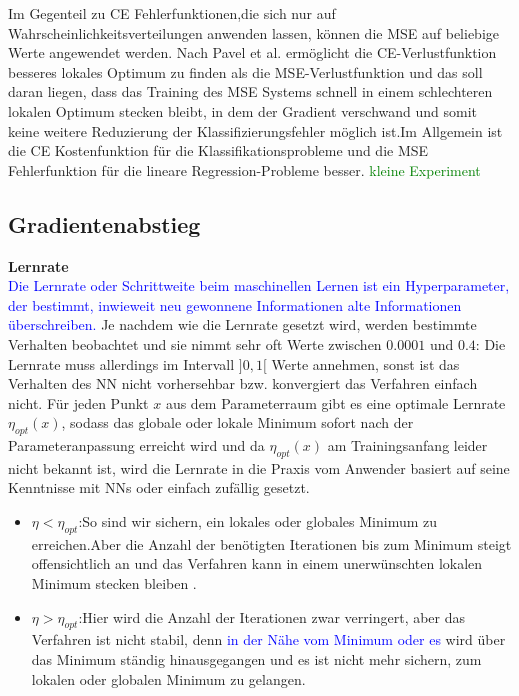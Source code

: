 \documentclass[12pt,a4paper]{scrartcl}
\numberwithin{equation}{section}
\begin{document}
Im Gegenteil zu CE Fehlerfunktionen,die sich nur auf Wahrscheinlichkeitsverteilungen anwenden lassen, können die MSE auf beliebige Werte angewendet werden. Nach Pavel et al.\cite{7} ermöglicht die CE-Verlustfunktion besseres lokales Optimum zu finden als die MSE-Verlustfunktion und das soll daran liegen, dass das Training des MSE Systems schnell in einem schlechteren lokalen Optimum stecken bleibt, in dem der Gradient verschwand und somit keine weitere Reduzierung der Klassifizierungsfehler möglich ist.Im Allgemein ist die CE Kostenfunktion für die Klassifikationsprobleme und die MSE Fehlerfunktion für die lineare Regression-Probleme besser.
\textcolor{green}{kleine Experiment}





\subsection{Gradientenabstieg}
\textbf{Lernrate}\\
\textcolor{blue}{Die Lernrate oder Schrittweite beim maschinellen Lernen ist ein Hyperparameter, der bestimmt, inwieweit neu gewonnene Informationen alte Informationen überschreiben\cite{LearningRate}.}
Je nachdem wie die Lernrate gesetzt wird, werden bestimmte Verhalten beobachtet und sie nimmt sehr oft Werte zwischen $ 0.0001 $ und $ 0.4 $:
Die Lernrate muss allerdings im Intervall  $]0,1[$ Werte annehmen, sonst ist das Verhalten des \ac{NN} nicht vorhersehbar bzw. konvergiert das Verfahren einfach nicht.
Für jeden Punkt $ x $ aus dem Parameterraum gibt es eine optimale Lernrate $ \eta_{opt}(x) $, sodass das globale oder lokale Minimum sofort nach der Parameteranpassung erreicht wird und da $ \eta_{opt}(x) $ am Trainingsanfang leider nicht bekannt ist, wird die Lernrate in die Praxis vom Anwender basiert auf seine Kenntnisse mit \acsp{NN} oder einfach zufällig gesetzt.
\begin{itemize}
	\item $ \eta < \eta_{opt} $:So sind wir sichern, ein lokales oder globales Minimum zu erreichen.Aber die Anzahl der benötigten Iterationen bis zum Minimum steigt offensichtlich an und das Verfahren kann in einem unerwünschten lokalen Minimum stecken bleiben .
	\item $ \eta > \eta_{opt} $:Hier wird die Anzahl der Iterationen zwar verringert, aber das Verfahren ist nicht stabil, denn \textcolor{blue}{in der Nähe vom Minimum oder es} wird über das Minimum ständig hinausgegangen und es ist nicht mehr sichern, zum lokalen oder globalen Minimum zu gelangen.
\end{itemize}
\end{document}
